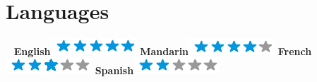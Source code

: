 \documentclass[]{cv}
\begin{document}
\begin{aside}
	~
	~
	~
	\section{Languages}
	~
	\textbf{English}\includegraphics[scale=0.40]{img/5stars.png}
	\textbf{Mandarin}\includegraphics[scale=0.40]{img/4stars.png}
	\textbf{French}\includegraphics[scale=0.40]{img/3stars.png}
	\textbf{Spanish}\includegraphics[scale=0.40]{img/2stars.png}
	~
\end{aside}
\end{document}
